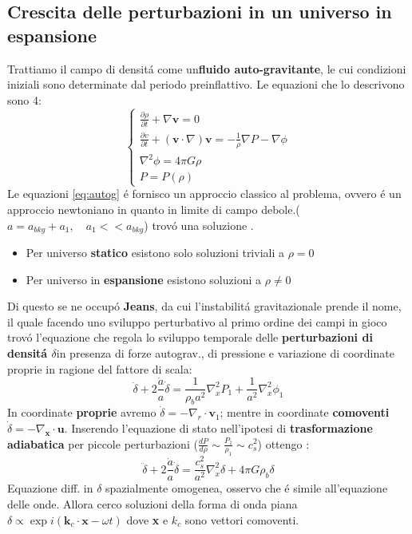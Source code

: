 \documentclass[12pt, a4paper]{article}
\begin{document}
\subsection{Crescita delle perturbazioni in un universo in espansione}
Trattiamo il campo di densit\'{a} come un\textbf{fluido auto-gravitante}, le cui condizioni iniziali sono determinate dal periodo preinflattivo. Le equazioni che lo descrivono sono 4:
\begin{equation}
\begin{cases}
\frac{\partial \rho}{\partial t}+\nabla \textbf{v}=0 
\\
\frac{\partial v}{\partial t}+(\textbf{v}\cdot\nabla)\textbf{v}= -\frac{1}{\rho} \nabla P-\nabla \phi
\\
\nabla^2 \phi=4 \pi G \rho
\\
P=P(\rho)
\end{cases}
\label{eq:autog}
\end{equation}
Le equazioni \ref{eq:autog} \'{e} fornisco un approccio classico al problema, ovvero \'{e} un approccio newtoniano in quanto in limite di campo debole.($a=a_{bkg}+a_1, \quad a_1<<a_{bkg}$) trov\'{o} una soluzione .
\begin{itemize}
\item Per universo \textbf{statico} esistono solo soluzioni triviali a $\rho=0$
\item Per universo in \textbf{espansione} esistono soluzioni a $\rho \neq 0$
\end{itemize}
 Di questo se ne occup\'{o} \textbf{Jeans}, da cui l'instabilit\'{a} gravitazionale prende il nome, il quale facendo uno sviluppo perturbativo al primo ordine dei campi in gioco trov\'{o} l'equazione che regola lo sviluppo temporale delle \textbf{perturbazioni di densit\'{a} $\delta$}in presenza di forze autograv., di pressione e variazione di coordinate proprie in ragione del fattore di scala:
 \begin{equation}
 \ddot{\delta}+2\frac{\dot{a}}{a}\dot{\delta}=\frac{1}{\rho_b a^2}\nabla_x^2P_1+\frac{1}{a^2}\nabla_x^2\phi_1
 \end{equation}
 In coordinate \textbf{proprie} avremo $\dot{\delta}=-\nabla_r \cdot \textbf{v}_1$; mentre in coordinate \textbf{comoventi} $\dot{\delta}=-\nabla_{\textbf{x}}\cdot \textbf{u}$. Inserendo l'equazione di stato nell'ipotesi di \textbf{trasformazione adiabatica} per piccole perturbazioni ($\frac{dP}{d\rho}\sim \frac{P_1}{\rho_1}\sim c_s^2$) ottengo :
 \begin{equation}
 \ddot{\delta}+2\frac{\dot{a}}{a}\dot{\delta}=\frac{c_s^2}{a^2}\nabla_x^2\delta+4\pi G\rho_b \delta
 \end{equation}
 Equazione diff. in $\delta$ spazialmente omogenea, osservo che \'{e} simile all'equazione delle onde. Allora cerco soluzioni della forma di onda piana $\delta\propto \exp{i(\textbf{k}_c\cdot\textbf{x}-\omega t)}$ dove \textbf{x} e \textbf{$k_c$} sono vettori comoventi.
\end{document}
